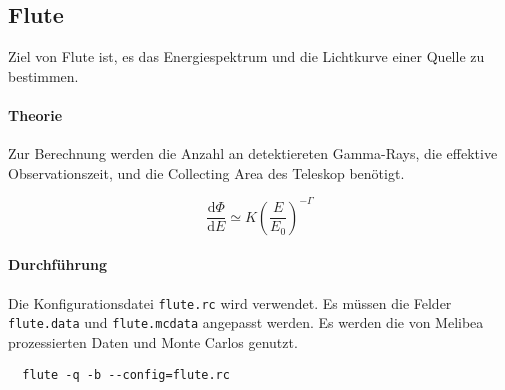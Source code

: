 \subsection{Flute}%
\label{sub:flute}
Ziel von Flute ist,
es das Energiespektrum und die Lichtkurve einer Quelle zu bestimmen.

\paragraph{Theorie}%
\label{par:theorie}

Zur Berechnung werden die Anzahl an detektiereten Gamma-Rays,
die effektive Observationszeit,
und die Collecting Area des Teleskop benötigt.

\begin{equation}
\frac{\text{d} \Phi}{\text{d}E} \simeq K {\left( \frac{E}{E_0} \right)}^{- \Gamma}
\end{equation}


\paragraph{Durchführung}%

Die Konfigurationsdatei \texttt{flute.rc} wird verwendet.
Es müssen die Felder \texttt{flute.data} und \texttt{flute.mcdata} angepasst werden.
Es werden die von Melibea prozessierten Daten und Monte Carlos genutzt.


\begin{lstlisting}
  flute -q -b --config=flute.rc
\end{lstlisting}
